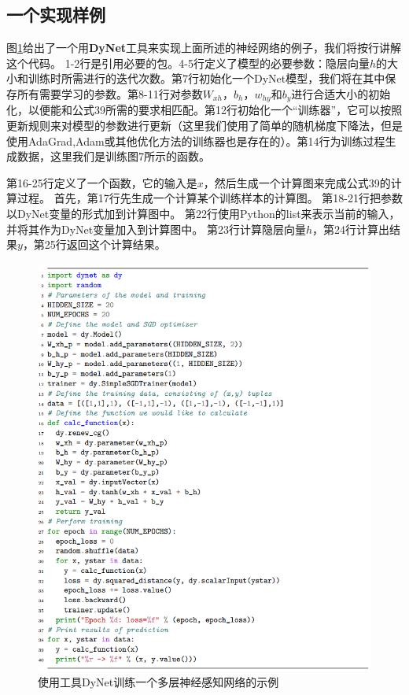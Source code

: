 \documentclass[10pt,a4paper]{ctexart}
\begin{document}
\subsection{一个实现样例}
图\ref{fig:11}给出了一个用\textbf{DyNet}工具来实现上面所述的神经网络的例子，我们将按行讲解这个代码。
1-2行是引用必要的包。4-5行定义了模型的必要参数：隐层向量\textbf{$h$}的大小和训练时所需进行的迭代次数。第7行初始化一个DyNet模型，我们将在其中保存所有需要学习的参数。第8-11行对参数$W_{xh}$，$b_h$，$w_{hy}$和$b_y$进行合适大小的初始化，以便能和公式39所需的要求相匹配。第12行初始化一个“训练器”，它可以按照更新规则来对模型的参数进行更新（这里我们使用了简单的随机梯度下降法，但是使用AdaGrad,Adam或其他优化方法的训练器也是存在的）。第14行为训练过程生成数据，这里我们是训练图7所示的函数。

第16-25行定义了一个函数，它的输入是\textbf{$x$}，然后生成一个计算图来完成公式39的计算过程。
首先，第17行先生成一个计算某个训练样本的计算图。
第18-21行把参数以DyNet变量的形式加到计算图中。
第22行使用Python的list来表示当前的输入，并将其作为DyNet变量加入到计算图中。
第23行计算隐层向量\textbf{$h$}，第24行计算出结果$y$，第25行返回这个计算结果。

\begin{figure}[H]
\centering
\includegraphics[width=1\textwidth]{fig11.png}
\caption{使用工具DyNet训练一个多层神经感知网络的示例}
\label{fig:11}
\end{figure}
\end{document}
